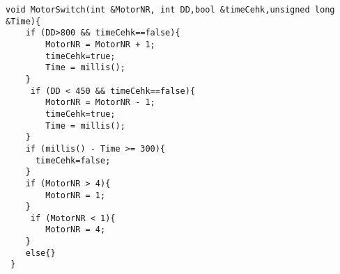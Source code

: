 \begin{lstlisting}[frame=single,language=Arduino] 
void MotorSwitch(int &MotorNR, int DD,bool &timeCehk,unsigned long &Time){
    if (DD>800 && timeCehk==false){
        MotorNR = MotorNR + 1;
        timeCehk=true;
        Time = millis();
    }
     if (DD < 450 && timeCehk==false){
        MotorNR = MotorNR - 1;
        timeCehk=true;
        Time = millis();
    }
    if (millis() - Time >= 300){
      timeCehk=false;
    }
    if (MotorNR > 4){
        MotorNR = 1;
    }
     if (MotorNR < 1){
        MotorNR = 4;
    } 
    else{}
 }
\end{lstlisting}
